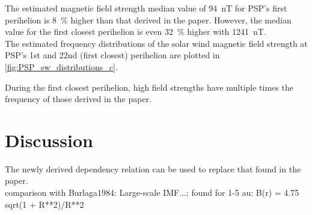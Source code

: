 The estimated magnetic field strength median value of \SI{94}{\nano\tesla} for PSP's first perihelion is \SI{8}{\%} higher than that derived in the paper. However, the median value for the first closest perihelion is even \SI{32}{\%} higher with \SI{1241}{\nano\tesla}.\\

The estimated frequency distributions of the solar wind magnetic field strength at PSP's 1st and 22nd (first closest) perihelion are plotted in \autoref{fig:PSP_sw_distributions_c}.
\begin{figure}[htb]
\end{figure}
During the first closest perihelion, high field strengths have multiple times the frequency of those derived in the paper.\\


\section{Discussion}
The newly derived dependency relation can be used to replace that found in the paper.\\

comparison with Burlaga1984: Large-scale IMF...; found for 1-5 au: B(r) = 4.75 sqrt(1 + R**2)/R**2\\


